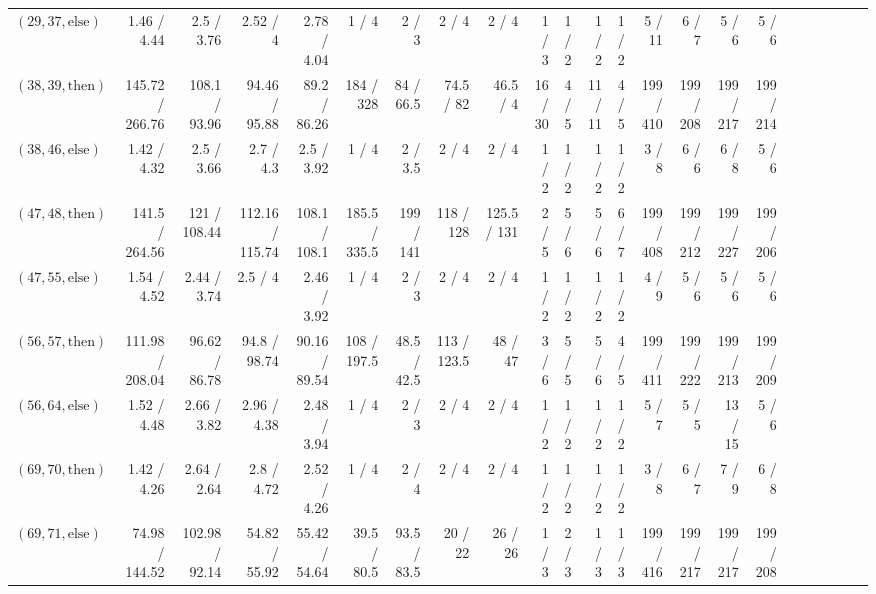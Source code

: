 \documentclass[sigconf]{acmart}
\newcommand{\thenBr}{\text{then}}
\newcommand{\elseBr}{\text{else}}
\begin{document}
\begin{table*}
{\begin{tabular}{l|rrrr|rrrr|rrrr|rrrr|r|r|r|r|r|r}
    $(29,37,\elseBr)$ & 1.46   / 4.44     & 2.5    / 3.76   & 2.52   / 4      & 2.78   / 4.04   & 1       / 4     & 2    / 3    & 2     / 4     & 2     / 4     & 1  / 3   & 1  / 2  & 1  / 2  & 1  / 2  & 5    / 11   & 6    / 7    & 5    / 6    & 5    / 6    & & & & & & \\
    $(38,39,\thenBr)$ & 145.72 / 266.76   & 108.1  / 93.96  & 94.46  / 95.88  & 89.2   / 86.26  & 184     / 328   & 84   / 66.5 & 74.5  / 82    & 46.5  / 4     & 16 / 30  & 4  / 5  & 11 / 11 & 4  / 5  & 199  / 410  & 199  / 208  & 199  / 217  & 199  / 214  & & & & & & \\
    $(38,46,\elseBr)$ & 1.42   / 4.32     & 2.5    / 3.66   & 2.7    / 4.3    & 2.5    / 3.92   & 1       / 4     & 2    / 3.5  & 2     / 4     & 2     / 4     & 1  / 2   & 1  / 2  & 1  / 2  & 1  / 2  & 3    / 8    & 6    / 6    & 6    / 8    & 5    / 6    & & & & & & \\
    $(47,48,\thenBr)$ & 141.5  / 264.56   & 121    / 108.44 & 112.16 / 115.74 & 108.1  / 108.1  & 185.5   / 335.5 & 199  / 141  & 118   / 128   & 125.5 / 131   & 2  / 5   & 5  / 6  & 5  / 6  & 6  / 7  & 199  / 408  & 199  / 212  & 199  / 227  & 199  / 206  & & & & & & \\
    $(47,55,\elseBr)$ & 1.54   / 4.52     & 2.44   / 3.74   & 2.5    / 4      & 2.46   / 3.92   & 1       / 4     & 2    / 3    & 2     / 4     & 2     / 4     & 1  / 2   & 1  / 2  & 1  / 2  & 1  / 2  & 4    / 9    & 5    / 6    & 5    / 6    & 5    / 6    & & & & & & \\
    $(56,57,\thenBr)$ & 111.98 / 208.04   & 96.62  / 86.78  & 94.8   / 98.74  & 90.16  / 89.54  & 108     / 197.5 & 48.5 / 42.5 & 113   / 123.5 & 48    / 47    & 3  / 6   & 5  / 5  & 5  / 6  & 4  / 5  & 199  / 411  & 199  / 222  & 199  / 213  & 199  / 209  & & & & & & \\
    $(56,64,\elseBr)$ & 1.52   / 4.48     & 2.66   / 3.82   & 2.96   / 4.38   & 2.48   / 3.94   & 1       / 4     & 2    / 3    & 2     / 4     & 2     / 4     & 1  / 2   & 1  / 2  & 1  / 2  & 1  / 2  & 5    / 7    & 5    / 5    & 13   / 15   & 5    / 6    & & & & & & \\
    $(69,70,\thenBr)$ & 1.42   / 4.26     & 2.64   / 2.64   & 2.8    / 4.72   & 2.52   / 4.26   & 1       / 4     & 2    / 4    & 2     / 4     & 2     / 4     & 1  / 2   & 1  / 2  & 1  / 2  & 1  / 2  & 3    / 8    & 6    / 7    & 7    / 9    & 6    / 8    & & & & & & \\
    $(69,71,\elseBr)$ & 74.98  / 144.52   & 102.98 / 92.14  & 54.82  / 55.92  & 55.42  / 54.64  & 39.5    / 80.5  & 93.5 / 83.5 & 20    / 22    & 26    / 26    & 1  / 3   & 2  / 3  & 1  / 3  & 1  / 3  & 199  / 416  & 199  / 217  & 199  / 217  & 199  / 208  & & & & & & \\

\end{tabular}}
\end{table*}
\end{document}
